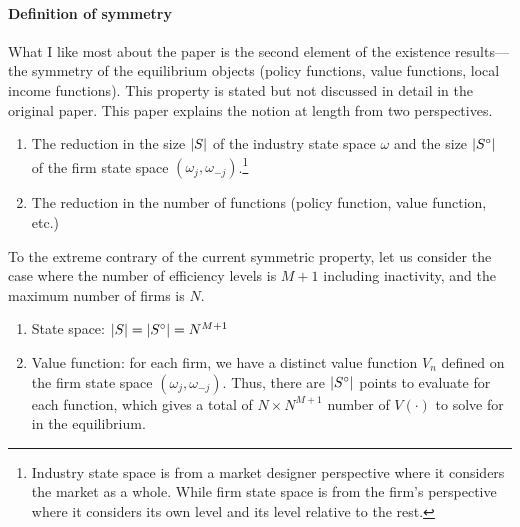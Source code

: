 \documentclass[12pt]{article}[margin=1in]
\begin{document}
\paragraph{Definition of symmetry} What I like most about the paper is the second element of the existence results—the symmetry of the equilibrium objects (policy functions, value functions, local income functions). This property is stated but not discussed in detail in the original \citet{ericson1995markov} paper. This paper explains the notion at length from two perspectives.
\begin{enumerate}
    \item The reduction in the size $\left| S\right|$ of the industry state space $\omega$ and the size $\left| S^\circ\right|$ of the firm state space $(\omega_j,\omega_{-j})$.\footnote{Industry state space is from a market designer perspective where it considers the market as a whole. While firm state space is from the firm's perspective where it considers its own level and its level relative to the rest.}
    \item The reduction in the number of functions (policy function, value function, etc.)
\end{enumerate}
To the extreme contrary of the current symmetric property, let us consider the case where the number of efficiency levels is $M+1$ including inactivity, and the maximum number of firms is $N$.
\begin{enumerate}
    \item State space: $\left| S\right|=\left| S^\circ\right| = N^{M+1}$
    \item Value function: for each firm, we have a distinct value function $V_n$ defined on the firm state space $(\omega_j,\omega_{-j})$. Thus, there are $\left| S^\circ\right|$ points to evaluate for each function, which gives a total of $N \times N^{M+1}$ number of $V(\cdot)$ to solve for in the equilibrium.
\end{enumerate}
\end{document}

